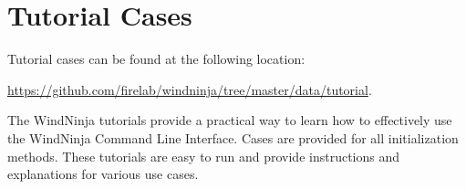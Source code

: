 \documentclass[12pt]{article}
\begin{document}
%
%
%

\section*{Tutorial Cases}

Tutorial cases can be found at the following location: 

\href{https://github.com/firelab/windninja/tree/master/data/tutorial}{https://github.com/firelab/windninja/tree/master/data/tutorial}.

The WindNinja tutorials provide a practical way to learn how to effectively use the WindNinja Command Line Interface. Cases are provided for all initialization methods. These tutorials are easy to run and provide instructions and explanations for various  use cases.
\end{document}

